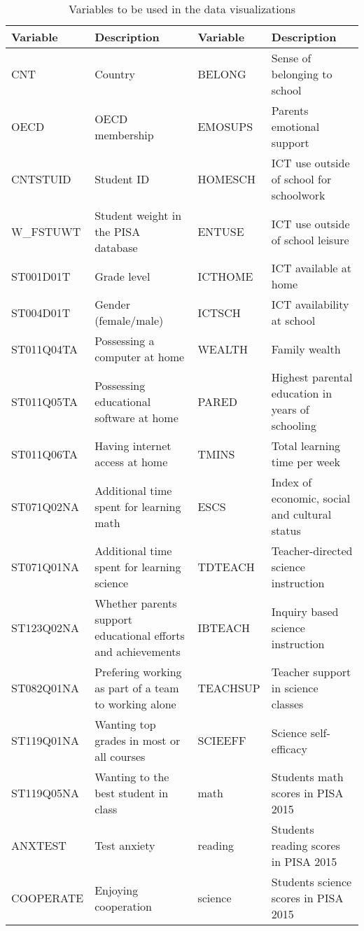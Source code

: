 \documentclass[
]{book}
\begin{document}
\begin{table}

\caption{\label{tab:tab1}Variables to be used in the data visualizations}
\centering
\begin{tabular}[t]{l|l|l|l}
\hline
Variable & Description & Variable & Description\\
\hline
CNT & Country & BELONG & Sense of belonging to school\\
\hline
OECD & OECD membership & EMOSUPS & Parents emotional support\\
\hline
CNTSTUID & Student ID & HOMESCH & ICT use outside of school for schoolwork\\
\hline
W\_FSTUWT & Student weight in the PISA database & ENTUSE & ICT use outside of school leisure\\
\hline
ST001D01T & Grade level & ICTHOME & ICT available at home\\
\hline
ST004D01T & Gender (female/male) & ICTSCH & ICT availability at school\\
\hline
ST011Q04TA & Possessing a computer at home & WEALTH & Family wealth\\
\hline
ST011Q05TA & Possessing educational software at home & PARED & Highest parental education in years of schooling\\
\hline
ST011Q06TA & Having internet access at home & TMINS & Total learning time per week\\
\hline
ST071Q02NA & Additional time spent for learning math & ESCS & Index of economic, social and cultural status\\
\hline
ST071Q01NA & Additional time spent for learning science & TDTEACH & Teacher-directed science instruction\\
\hline
ST123Q02NA & Whether parents support educational efforts and achievements & IBTEACH & Inquiry based science instruction\\
\hline
ST082Q01NA & Prefering working as part of a team to working alone & TEACHSUP & Teacher support in science classes\\
\hline
ST119Q01NA & Wanting top grades in most or all courses & SCIEEFF & Science self-efficacy\\
\hline
ST119Q05NA & Wanting to the best student in class & math & Students math scores in PISA 2015\\
\hline
ANXTEST & Test anxiety & reading & Students reading scores in PISA 2015\\
\hline
COOPERATE & Enjoying cooperation & science & Students science scores in PISA 2015\\
\hline
\end{tabular}
\end{table}
\end{document}
